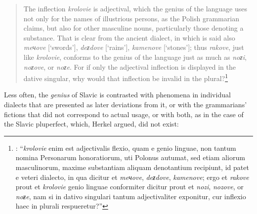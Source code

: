 \begin{quote}
    The inflection \textit{krolovie} is adjectival, which the genius of the language uses not only for the names of illustrious persons, as the Polish grammarian claims, but also for other masculine nouns, particularly those denoting a substance. That is clear from the ancient dialect, in which is said also \textit{meчove} [‘swords’], \textit{deƶdove} [‘rains’], \textit{kamenove} [‘stones’]; thus \textit{rakove}, just like \textit{krolo\-vie}, conforms to the genius of the language just as much as \textit{noƶi}, \textit{noƶove}, or \textit{noƶe}. For if only the adjectival inflection is displayed in the dative singular, why would that inflection be invalid in the plural?\footnote{\citet[38--39]{herkel_elementa_1826}: “\textit{krolovie} enim est adjectivalis flexio, quam e genio linguae, non tantum nomina Personarum honoratiorum, uti Polonus autumat, sed etiam aliorum masculinorum, maxime substantiam aliquam denotantium recipiunt, id patet e veteri dialecto, in qua dicitur et \textit{meчove}, \textit{deƶdove}, \textit{kamenove}; ergo et \textit{rakove} prout et \textit{krolovie} genio linguae conformiter dicitur prout et \textit{nozi}, \textit{nozove}, or \textit{noƶe}, nam si in dativo singulari tantum adjectivaliter exponitur, cur inflexio haec in plurali respueretur?”}
\end{quote}

\noindent Less often, the \textit{genius} of Slavic is contrasted with phenomena in individual dialects that are presented as later deviations from it, or with the grammarians’ fictions that did not correspond to actual usage, or with both, as in the case of the Slavic pluperfect, which, Herkel argued, did not exist:

